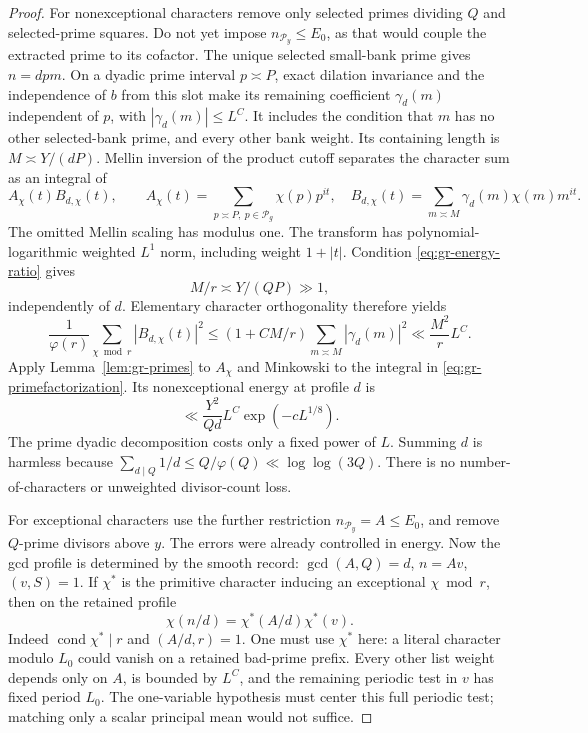 \begin{proof}
For nonexceptional characters remove only selected primes dividing
\(Q\) and selected-prime squares.  Do not yet impose \(n_{\mathcal P_y}\le E_0\),
as that would couple the extracted prime to its cofactor.
The unique selected small-bank prime gives \(n=dpm\).
On a dyadic prime interval \(p\asymp P\), exact dilation invariance
and the independence of \(b\) from this slot make its remaining
coefficient \(\gamma_d(m)\) independent of \(p\), with
\(|\gamma_d(m)|\le L^C\).
It includes the condition that \(m\) has no other selected-bank prime,
and every other bank weight.  Its containing length is
\(M\asymp Y/(dP)\).
Mellin inversion of the product cutoff separates the character sum as
an integral of
\begin{equation}
 A_\chi(t)B_{d,\chi}(t),\qquad
 A_\chi(t)=\sum_{p\asymp P,\ p\in\mathcal P_g}\chi(p)p^{it},
 \quad
 B_{d,\chi}(t)=\sum_{m\asymp M}\gamma_d(m)\chi(m)m^{it}.
 \label{eq:gr-primefactorization}
\end{equation}
The omitted Mellin scaling has modulus one.
The transform has polynomial-logarithmic weighted \(L^1\) norm,
including weight \(1+|t|\).
Condition \eqref{eq:gr-energy-ratio} gives
\[
                       M/r\asymp Y/(QP)\gg1,
\]
independently of \(d\).
Elementary character orthogonality therefore yields
\begin{equation}
 \frac1{\varphi(r)}\sum_{\chi\bmod r}|B_{d,\chi}(t)|^2
 \le(1+CM/r)\sum_{m\asymp M}|\gamma_d(m)|^2
                  \ll \frac{M^2}{r}L^C.             \label{eq:gr-cofactorenergy}
\end{equation}
Apply Lemma~\ref{lem:gr-primes} to \(A_\chi\) and Minkowski to the
integral in \eqref{eq:gr-primefactorization}.
Its nonexceptional energy at profile \(d\) is
\begin{equation}
 \ll \frac{Y^2}{Qd}L^C\exp(-cL^{1/8}).               \label{eq:gr-nonexceptional}
\end{equation}
The prime dyadic decomposition costs only a fixed power of \(L\).
Summing \(d\) is harmless because
\(\sum_{d\mid Q}1/d\le Q/\varphi(Q)\ll\log\log(3Q)\).
There is no number-of-characters or unweighted divisor-count loss.

For exceptional characters use the further restriction
\(n_{\mathcal P_y}=A\le E_0\), and remove \(Q\)-prime divisors above \(y\).
The errors were already controlled in energy.
Now the gcd profile is determined by the smooth record:
\(\gcd(A,Q)=d\), \(n=Av\), \((v,S)=1\).
If \(\chi^*\) is the primitive character inducing an exceptional
\(\chi\bmod r\), then on the retained profile
\[
             \chi(n/d)=\chi^*(A/d)\chi^*(v).
\]
Indeed \(\operatorname{cond}\chi^*\mid r\) and
\((A/d,r)=1\). One must use \(\chi^*\) here: a literal character
modulo \(L_0\) could vanish on a retained bad-prime prefix.
Every other list weight depends only on \(A\), is bounded by \(L^C\),
and the remaining periodic test in \(v\) has fixed period \(L_0\).
The one-variable hypothesis must center this full periodic test;
matching only a scalar principal mean would not suffice.


\end{proof}
